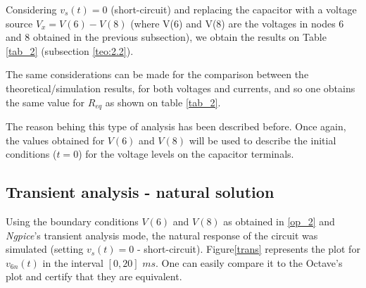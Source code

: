 \vspace{5mm}
\par Considering $v_s(t)=0$ (short-circuit) and replacing the capacitor with a voltage source $V_x = V(6)-V(8)$ (where V(6) and V(8) are the voltages in nodes $6$ and $8$ obtained in the previous subsection), we obtain the results on Table \ref{tab_2} (subsection \ref{teo:2.2}). 


\vspace{3mm}
\par The same considerations can be made for the comparison between the theoretical/simulation results, for both voltages and currents, and so one obtains the same value for $R_{eq}$ as shown on table \ref{tab_2}.

\vspace{3mm}
\par The reason behing this type of analysis has been described before. Once again, the values obtained for $V(6)$ and $V(8)$ will be used to describe the initial conditions ($t=0$) for the voltage levels on the capacitor terminals.
\vspace{5mm}

\subsection{Transient analysis - natural solution}

\vspace{5mm}
\par Using the boundary conditions $V(6)$ and $V(8)$ as obtained in \ref{op_2} and \textit{Ngpice}’s transient analysis mode, the natural response of the circuit was simulated (setting $v_s(t)=0$ - short-circuit). Figure\ref{trans} represents the plot for $v_{6n}(t)$ in the interval $[0, 20]$ $ms$. One can easily compare it to the Octave's plot and certify that they are equivalent.

